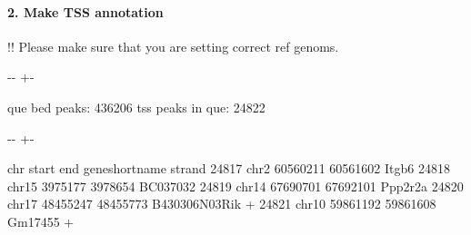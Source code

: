 \documentclass[letterpaper,10pt,english]{sphinxmanual}
\newlength\nbsphinxcodecellspacing
\begin{document}
\paragraph{2. Make TSS annotation}
\label{\detokenize{notebooks/01_ATAC-seq_data_processing/option2_Bulk_ATAC-seq_data/01_preprocess_Bulk_ATAC_seq_peak_data:2.-Make-TSS-annotation}}
!! Please make sure that you are setting correct ref genoms.

{
%
\begin{sphinxVerbatim}[commandchars=\\\{\}]
\llap{\color{nbsphinxin}[7]:\,\hspace{\fboxrule}\hspace{\fboxsep}}   

\end{sphinxVerbatim}
}



%
{
\kern-\sphinxverbatimsmallskipamount\kern-\baselineskip
\kern+\FrameHeightAdjust\kern-\fboxrule
\vspace{\nbsphinxcodecellspacing}
%
\begin{sphinxVerbatim}[commandchars=\\\{\}]
que bed peaks: 436206
tss peaks in que: 24822
\end{sphinxVerbatim}
}
\relax

{

\kern-\sphinxverbatimsmallskipamount\kern-\baselineskip
\kern+\FrameHeightAdjust\kern-\fboxrule
\vspace{\nbsphinxcodecellspacing}

%
\begin{sphinxVerbatim}[commandchars=\\\{\}]
\llap{\color{nbsphinxout}[7]:\,\hspace{\fboxrule}\hspace{\fboxsep}}         chr     start       end gene\PYGZus{}short\PYGZus{}name strand
24817   chr2  60560211  60561602           Itgb6      \PYGZhy{}
24818  chr15   3975177   3978654        BC037032      \PYGZhy{}
24819  chr14  67690701  67692101         Ppp2r2a      \PYGZhy{}
24820  chr17  48455247  48455773   B430306N03Rik      +
24821  chr10  59861192  59861608         Gm17455      +
\end{sphinxVerbatim}
}
\end{document}
